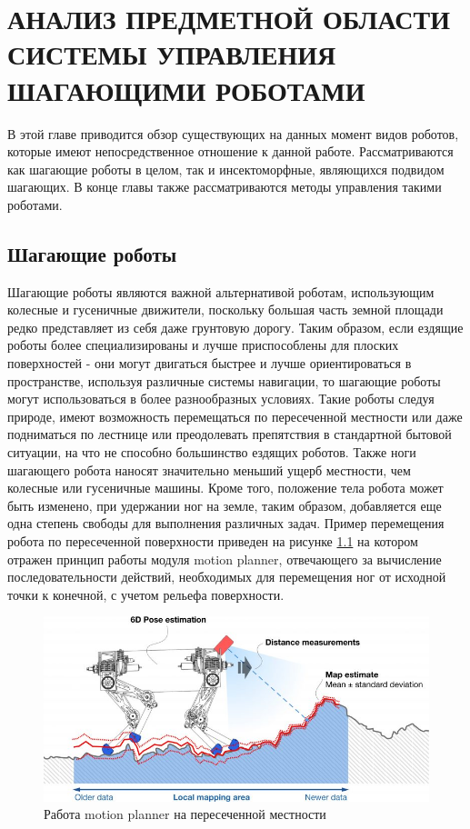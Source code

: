 \chapter{АНАЛИЗ ПРЕДМЕТНОЙ ОБЛАСТИ СИСТЕМЫ УПРАВЛЕНИЯ ШАГАЮЩИМИ РОБОТАМИ}
В этой главе приводится обзор существующих на данных момент видов роботов, которые имеют непосредственное отношение к данной работе. Рассматриваются как шагающие роботы в целом, так и инсектоморфные, являющихся подвидом шагающих. В конце главы также рассматриваются методы управления такими роботами.

\section{Шагающие роботы}

Шагающие роботы являются важной альтернативой роботам, использующим колесные и гусеничные движители, поскольку большая часть земной площади редко представляет из себя даже грунтовую дорогу. Таким образом, если ездящие роботы более специализированы и лучше приспособлены для плоских поверхностей - они могут двигаться быстрее и лучше ориентироваться в пространстве, используя различные системы навигации, то шагающие роботы могут использоваться в более разнообразных условиях. Такие роботы следуя природе, имеют возможность перемещаться по пересеченной местности или даже подниматься по лестнице или преодолевать препятствия в стандартной бытовой ситуации, на что не способно большинство ездящих роботов. Также ноги шагающего робота наносят значительно меньший ущерб местности, чем колесные или гусеничные машины. Кроме того, положение тела робота может быть изменено, при удержании ног на земле, таким образом, добавляется еще одна степень свободы для выполнения различных задач. Пример перемещения робота по пересеченной поверхности приведен на рисунке \ref{img:motion_planning} на котором отражен принцип работы модуля motion planner, отвечающего за вычисление последовательности действий, необходимых для перемещения ног от исходной точки к конечной, с учетом рельефа поверхности.

\begin{figure}
	\centering
	\includegraphics[]{img/robot_walks}
	\caption{Работа motion planner на пересеченной местности}
	\label{img:motion_planning}
\end{figure}

